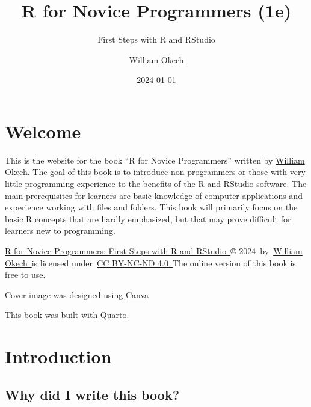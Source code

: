 \documentclass[
  letterpaper,
  DIV=11,
  numbers=noendperiod]{scrreprt}
\title{R for Novice Programmers (1e)}
\subtitle{First Steps with R and RStudio}
\author{William Okech}
\date{2024-01-01}
\renewcommand*\contentsname{Table of contents}
\newcommand\contentsname{Table of contents}
\begin{document}
\maketitle

\renewcommand*\contentsname{Table of contents}
{
\hypersetup{linkcolor=}
\setcounter{tocdepth}{2}
\tableofcontents
}

\chapter*{Welcome}\label{welcome}


This is the website for the book ``R for Novice Programmers'' written by
\href{https://www.williamokech.com}{William Okech}. The goal of this
book is to introduce non-programmers or those with very little
programming experience to the benefits of the R and RStudio software.
The main prerequisites for learners are basic knowledge of computer
applications and experience working with files and folders. This book
will primarily focus on the basic R concepts that are hardly emphasized,
but that may prove difficult for learners new to programming.

\href{https://wokech.github.io/r4novice/}{R for Novice Programmers:
First Steps with R and RStudio~}©
2024~by~\href{https://www.williamokech.com/}{William Okech~}is licensed
under~\href{http://creativecommons.org/licenses/by-nc-nd/4.0/?ref=chooser-v1}{CC
BY-NC-ND
4.0~}The
online version of this book is free to use.

Cover image was designed using \href{https://www.canva.com/}{Canva}

This book was built with \href{https://quarto.org/}{Quarto}.


\chapter*{Introduction}\label{introduction}


\section*{Why did I write this book?}\label{why-did-i-write-this-book}
\end{document}
